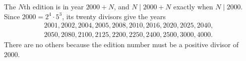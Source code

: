 The $N$th edition is in year $2000+N$, and $N\mid2000+N$ exactly when $N\mid2000$. Since $2000=2^4\cdot5^3$, its twenty divisors give the years
\[\boxed{\begin{gathered}2001,2002,2004,2005,2008,2010,2016,2020,2025,2040,\\2050,2080,2100,2125,2200,2250,2400,2500,3000,4000.\end{gathered}}\]
There are no others because the edition number must be a positive divisor of $2000$.
